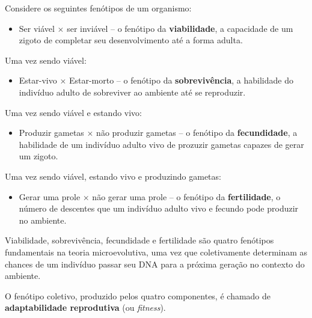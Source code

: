 \documentclass[
]{book}
\providecommand{\tightlist}{%
  \setlength{\itemsep}{0pt}\setlength{\parskip}{0pt}}
\begin{document}
Considere os seguintes fenótipos de um organismo:

\begin{itemize}
\tightlist
\item
  Ser viável \(\times\) ser inviável -- o fenótipo da \textbf{viabilidade}, a capacidade de um zigoto de completar seu desenvolvimento até a forma adulta.
\end{itemize}

Uma vez sendo viável:

\begin{itemize}
\tightlist
\item
  Estar-vivo \(\times\) Estar-morto -- o fenótipo da \textbf{sobrevivência}, a habilidade do indivíduo adulto de sobreviver ao ambiente até se reproduzir.
\end{itemize}

Uma vez sendo viável e estando vivo:

\begin{itemize}
\tightlist
\item
  Produzir gametas \(\times\) não produzir gametas -- o fenótipo da \textbf{fecundidade}, a habilidade de um indivíduo adulto vivo de prozuzir gametas capazes de gerar um zigoto.
\end{itemize}

Uma vez sendo viável, estando vivo e produzindo gametas:

\begin{itemize}
\tightlist
\item
  Gerar uma prole \(\times\) não gerar uma prole -- o fenótipo da \textbf{fertilidade}, o número de descentes que um indivíduo adulto vivo e fecundo pode produzir no ambiente.
\end{itemize}

Viabilidade, sobrevivência, fecundidade e fertilidade são quatro fenótipos fundamentais na teoria microevolutiva, uma vez que coletivamente determinam as chances de um indivíduo passar seu DNA para a próxima geração no contexto do ambiente.

O fenótipo coletivo, produzido pelos quatro componentes, é chamado de \textbf{adaptabilidade reprodutiva} (ou \emph{fitness}).
\end{document}
